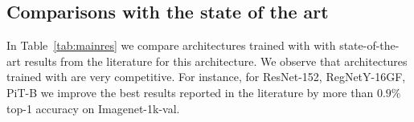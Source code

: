 \begin{table}
    \centering
    \vspace{-0.5em}
    \caption{We measure the impact of layer-decay during the finetuning on Imagenet-1k for models pre-trained on Imagenet-21k with \ours during 90 epochs (default) and 270 epochs (long training).  
    \label{tab:ablation_21k}}
\end{table}




\subsection{Comparisons with the state of the art}


In Table~\ref{tab:mainres} we compare architectures trained with \ours with state-of-the-art results from the literature for this architecture. We observe that architectures trained with \ours are very competitive.
For instance, for ResNet-152, RegNetY-16GF, PiT-B we improve the best results reported in the literature by more than $0.9\%$ top-1 accuracy on Imagenet-1k-val.

